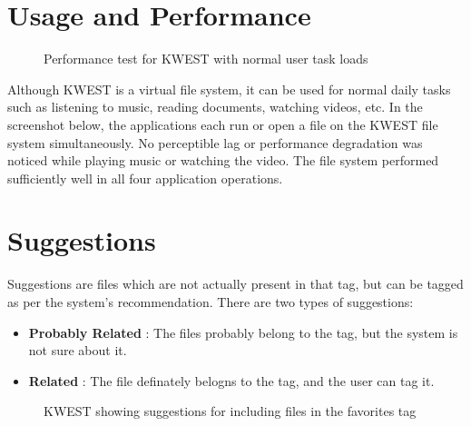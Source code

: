 \section{Usage and Performance}
\begin{figure}[htb]
\centering
\setlength\fboxsep{0pt}
\setlength\fboxrule{0.5pt}
\caption{Performance test for KWEST with normal user task loads}
\label{fig:dfd0}
\end{figure}
Although KWEST is a virtual file system, it can be used for normal daily tasks such as listening to music, reading documents, watching videos, etc. In the screenshot below, the applications each run or open a file on the KWEST file system simultaneously. No perceptible lag or performance degradation was noticed while playing music or watching the video. The file system performed sufficiently well in all four application operations.

\section{Suggestions}
Suggestions are files which are not actually present in that tag, but can be tagged as per the system's recommendation. There are two types of suggestions:
\begin{itemize}
\item \textbf{Probably Related} : The files probably belong to the tag, but the system is not sure about it.
\item \textbf{Related} : The file definately belogns to the tag, and the user can tag it.
\end{itemize}
\begin{figure}[htb]
\centering
\setlength\fboxsep{0pt}
\setlength\fboxrule{0.5pt}
\caption{KWEST showing suggestions for including files in the favorites tag}
\label{fig:dfd0}
\end{figure}

